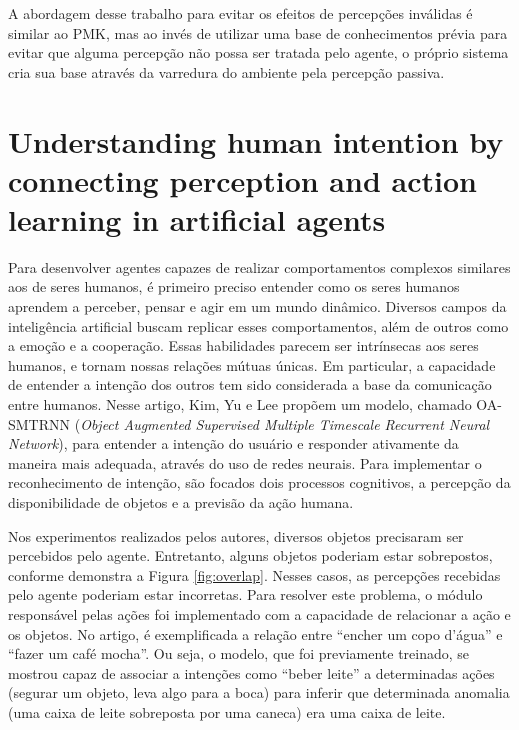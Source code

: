 A abordagem desse trabalho para evitar os efeitos de percepções inválidas é similar ao PMK, mas ao invés de utilizar uma base de conhecimentos prévia para evitar que alguma percepção não possa ser tratada pelo agente, o próprio sistema cria sua base através da varredura do ambiente pela percepção passiva.

\section{Understanding human intention by connecting perception and action learning in artificial agents \cite{kim2017understanding}}

\label{kim2017}
Para desenvolver agentes capazes de realizar comportamentos complexos similares aos de seres humanos, é primeiro preciso entender como os seres humanos aprendem a perceber, pensar e agir em um mundo dinâmico. Diversos campos da inteligência artificial buscam replicar esses comportamentos, além de outros como a emoção e a cooperação. Essas habilidades parecem ser intrínsecas aos seres humanos, e tornam nossas relações mútuas únicas. Em particular, a capacidade de entender a intenção dos outros tem sido considerada a base da comunicação entre humanos. Nesse artigo, Kim, Yu e Lee propõem um modelo, chamado OA-SMTRNN (\textit{Object Augmented Supervised Multiple Timescale
Recurrent Neural Network}), para entender a intenção do usuário e responder ativamente da maneira mais adequada, através do uso de redes neurais. Para implementar o reconhecimento de intenção, são focados dois processos cognitivos, a percepção da disponibilidade de objetos e a previsão da ação humana.

Nos experimentos realizados pelos autores, diversos objetos precisaram ser percebidos pelo agente. Entretanto, alguns objetos poderiam estar sobrepostos, conforme demonstra a Figura \ref{fig:overlap}. Nesses casos, as percepções recebidas pelo agente poderiam estar incorretas. Para resolver este problema, o módulo responsável pelas ações foi implementado com a capacidade de relacionar a ação e os objetos. No artigo, é exemplificada a relação entre ``encher um copo d'água'' e ``fazer um café mocha''. Ou seja, o modelo, que foi previamente treinado, se mostrou capaz de associar a intenções como ``beber leite'' a determinadas ações (segurar um objeto, leva algo para a boca) para inferir que determinada anomalia (uma caixa de leite sobreposta por uma caneca) era uma caixa de leite.

